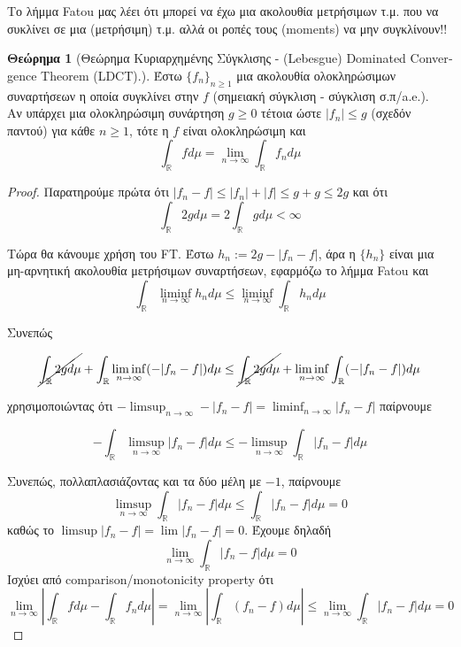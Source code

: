 \documentclass[12pt,a4paper]{article}
\theoremstyle{definition}
\numberwithin{equation}{section}
\newtheorem{theorima}{Θεώρημα}
\begin{document}
{Το λήμμα \textlatin{Fatou} μας λέει ότι μπορεί να έχω μια ακολουθία μετρήσιμων τ.μ. που να συκλίνει σε μια (μετρήσιμη) τ.μ. αλλά οι ροπές τους
(moments) να μην συγκλίνουν!!
\pagebreak

\begin{theorima}[Θεώρημα Κυριαρχημένης Σύγκλισης - \textlatin{(Lebesgue) Dominated Convergence Theorem (LDCT)}.] Έστω $\{f_n\}_{n\geq 1}$ μια ακολουθία ολοκληρώσιμων συναρτήσεων
η οποία συγκλίνει στην $f$ (σημειακή σύγκλιση - σύγκλιση σ.π/a.e.).\\
Αν υπάρχει μια ολοκληρώσιμη συνάρτηση $g\geq 0$ τέτοια ώστε $|f_n| \leq g$ (σχεδόν παντού) για κάθε $n\geq 1$, τότε η $f$ είναι
ολοκληρώσιμη και
$$\int_\mathbb{R} f d\mu = \lim_{n\rightarrow \infty} \int_\mathbb{R} f_n d\mu$$
\end{theorima}

\begin{proof}
Παρατηρούμε πρώτα ότι $|f_n - f| \leq |f_n| + |f| \leq g + g \leq 2g$ και ότι\\
$$\int_\mathbb{R} 2g d\mu = 2\int_{\mathbb{R}}g d\mu < \infty$$

Τώρα θα κάνουμε χρήση του FT. Έστω $h_n := 2g - |f_n - f|$, άρα η $\{h_n\}$ είναι μια μη-αρνητική ακολουθία μετρήσιμων συναρτήσεων, εφαρμόζω το λήμμα \textlatin{Fatou} και
$$\int_\mathbb{R} \liminf_{n\rightarrow \infty} h_n d\mu \leq \liminf_{n\rightarrow \infty} \int_\mathbb{R} h_n d\mu $$

Συνεπώς

$$ \cancel{\int_\mathbb{R} 2g d\mu} + \int_\mathbb{R} \liminf_{n\rightarrow \infty} (-|f_n - f|) d\mu \leq \cancel{\int_\mathbb{R} 2g d\mu} + \liminf_{n\rightarrow \infty} \int_\mathbb{R}(-|f_n -f|) d\mu$$

χρησιμοποιώντας ότι $-\limsup_{n\rightarrow \infty} -|f_n-f| = \liminf_{n\rightarrow \infty} |f_n -f|$ παίρνουμε

$$ - \int_\mathbb{R} \limsup_{n\rightarrow \infty} |f_n -f| d\mu \leq - \limsup_{n\rightarrow \infty} \int_\mathbb{R} |f_n-f|d\mu$$

Συνεπώς, πολλαπλασιάζοντας και τα δύο μέλη με $-1$, παίρνουμε
$$\limsup_{n\rightarrow \infty} \int_\mathbb{R} |f_n - f| d\mu \leq \int_\mathbb{R} |f_n-f| d\mu = 0$$
καθώς το $\limsup |f_n - f| = \lim |f_n- f| = 0$. Έχουμε δηλαδή
$$\lim_{n\rightarrow \infty} \int_\mathbb{R}|f_n - f| d\mu = 0$$
Ισχύει από comparison/monotonicity property ότι
$$\lim_{n\rightarrow \infty} | \int_\mathbb{R} fd\mu - \int_\mathbb{R} f_n d\mu| = \lim_{n\rightarrow \infty} |\int_\mathbb{R} (f_n -f) d\mu| \leq \lim_{n\rightarrow \infty} \int_\mathbb{R} |f_n-f| d\mu =0 $$
\end{proof}

}
\end{document}
